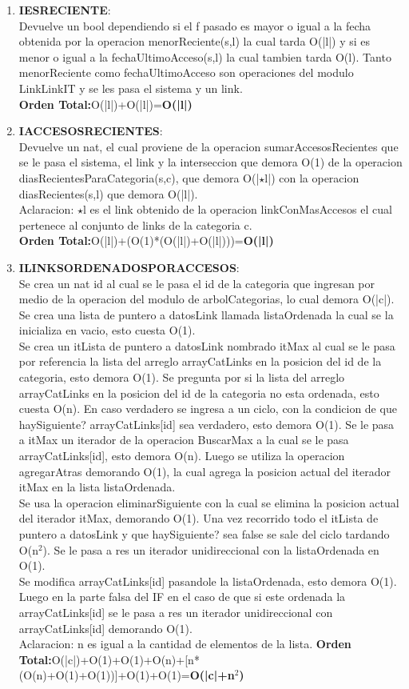 \documentclass[10pt, a4paper]{article}
\begin{document}
\begin{enumerate}
\item \textbf{IESRECIENTE}:\\ Devuelve un bool dependiendo si el f pasado es mayor o igual a la fecha obtenida por la operacion menorReciente(s,l) la cual tarda O(|l|) y si es menor o igual a la fechaUltimoAcceso(s,l) la cual tambien tarda O(l). Tanto menorReciente como fechaUltimoAcceso son operaciones del modulo LinkLinkIT y se les pasa el sistema y un link.\\
\textbf{Orden Total:}O(|l|)+O(|l|)=\textbf{O(|l|)}
      
     \item \textbf{IACCESOSRECIENTES}:\\ Devuelve un nat, el cual proviene de la operacion sumarAccesosRecientes que se le pasa el sistema, el link y la interseccion que demora O(1) de la operacion diasRecientesParaCategoria(s,c), que demora O(|$\star$l|) con la operacion diasRecientes(s,l) que demora O(|l|).\\
Aclaracion: $\star$l es el link obtenido de la operacion linkConMasAccesos el cual pertenece al conjunto de links de la categoria c. \\
\textbf{Orden Total:}O(|l|)+(O(1)*(O(|l|)+O(|l|)))=\textbf{O(|l|)}

     \item \textbf{ILINKSORDENADOSPORACCESOS}:\\ Se crea un nat id al cual se le pasa el id de la categoria que ingresan por medio de la operacion del modulo de arbolCategorias, lo cual demora O(|c|). Se crea una lista de puntero a datosLink llamada listaOrdenada la cual se la inicializa en vacio, esto cuesta O(1).\\
Se crea un itLista de puntero a datosLink nombrado itMax al cual se le pasa por referencia la lista del arreglo arrayCatLinks en la posicion del id de la categoria, esto demora O(1).
Se pregunta por si la lista del arreglo arrayCatLinks en la posicion del id de la categoria no esta ordenada, esto cuesta O(n). En caso verdadero se ingresa a un ciclo, con la condicion de que haySiguiente? arrayCatLinks[id] sea verdadero, esto demora O(1).
Se le pasa a itMax un iterador de la operacion BuscarMax a la cual se le pasa arrayCatLinks[id], esto demora O(n). Luego se utiliza la operacion agregarAtras demorando O(1), la cual agrega la posicion actual del iterador itMax en la lista listaOrdenada.\\
Se usa la operacion eliminarSiguiente con la cual se elimina la posicion actual del iterador itMax, demorando O(1). Una vez recorrido todo el itLista de puntero a datosLink y que haySiguiente? sea false se sale del ciclo tardando O(n${^2}$). Se le pasa a res un iterador unidireccional con la listaOrdenada en O(1).\\
Se modifica arrayCatLinks[id] pasandole la listaOrdenada, esto demora O(1). Luego en la parte falsa del IF en el caso de que si este ordenada la arrayCatLinks[id] se le pasa a res un iterador unidireccional con arrayCatLinks[id] demorando O(1). \\
Aclaracion: n es igual a la cantidad de elementos de la lista.
\textbf{Orden Total:}O(|c|)+O(1)+O(1)+O(n)+[n*(O(n)+O(1)+O(1))]+O(1)+O(1)=\textbf{O(|c|+n${^2}$)}


\end{enumerate}
\end{document}
